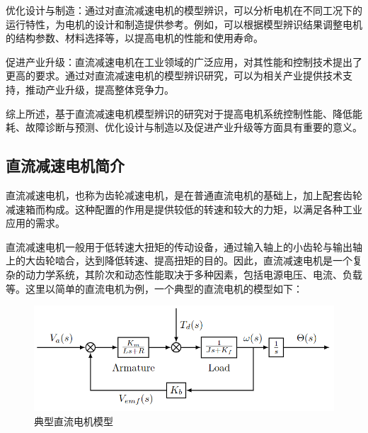 \documentclass[UTF8, twocolumn]{article}
\begin{document}
优化设计与制造：通过对直流减速电机的模型辨识，可以分析电机在不同工况下的运行特性，为电机的设计和制造提供参考。例如，可以根据模型辨识结果调整电机的结构参数、材料选择等，以提高电机的性能和使用寿命。

促进产业升级：直流减速电机在工业领域的广泛应用，对其性能和控制技术提出了更高的要求。通过对直流减速电机的模型辨识研究，可以为相关产业提供技术支持，推动产业升级，提高整体竞争力。

综上所述，基于直流减速电机模型辨识的研究对于提高电机系统控制性能、降低能耗、故障诊断与预测、优化设计与制造以及促进产业升级等方面具有重要的意义。














\subsection{直流减速电机简介}

直流减速电机，也称为齿轮减速电机，是在普通直流电机的基础上，加上配套齿轮减速箱而构成。这种配置的作用是提供较低的转速和较大的力矩，以满足各种工业应用的需求。

直流减速电机一般用于低转速大扭矩的传动设备，通过输入轴上的小齿轮与输出轴上的大齿轮啮合，达到降低转速、提高扭矩的目的。因此，直流减速电机是一个复杂的动力学系统，其阶次和动态性能取决于多种因素，包括电源电压、电流、负载等。这里以简单的直流电机为例，一个典型的直流电机的模型如下：
\begin{figure}[H]
    \centering %
    \includegraphics[width=.45\textwidth]{figure/直流电机模型.png} 
    \caption{典型直流电机模型} %
\end{figure}
\end{document}
